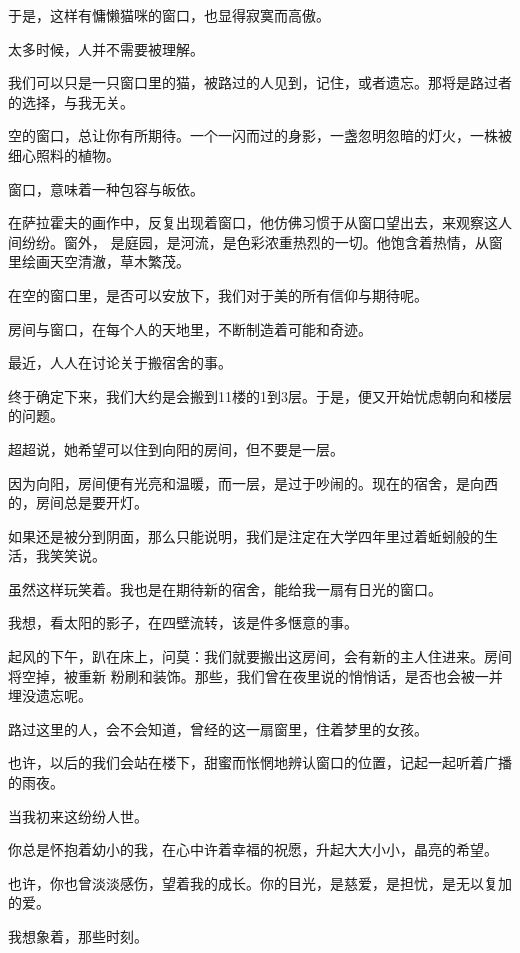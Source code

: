 		于是，这样有慵懒猫咪的窗口，也显得寂寞而高傲。


		太多时候，人并不需要被理解。

		我们可以只是一只窗口里的猫，被路过的人见到，记住，或者遗忘。那将是路过者的选择，与我无关。

		空的窗口，总让你有所期待。一个一闪而过的身影，一盏忽明忽暗的灯火，一株被细心照料的植物。

		窗口，意味着一种包容与皈依。

		在萨拉霍夫的画作中，反复出现着窗口，他仿佛习惯于从窗口望出去，来观察这人间纷纷。窗外，
	是庭园，是河流，是色彩浓重热烈的一切。他饱含着热情，从窗里绘画天空清澈，草木繁茂。

		在空的窗口里，是否可以安放下，我们对于美的所有信仰与期待呢。\par
		房间与窗口，在每个人的天地里，不断制造着可能和奇迹。

		最近，人人在讨论关于搬宿舍的事。\par
		终于确定下来，我们大约是会搬到11楼的1到3层。于是，便又开始忧虑朝向和楼层的问题。\par
		超超说，她希望可以住到向阳的房间，但不要是一层。\par
		因为向阳，房间便有光亮和温暖，而一层，是过于吵闹的。现在的宿舍，是向西的，房间总是要开灯。\par
		如果还是被分到阴面，那么只能说明，我们是注定在大学四年里过着蚯蚓般的生活，我笑笑说。

		虽然这样玩笑着。我也是在期待新的宿舍，能给我一扇有日光的窗口。\par
		我想，看太阳的影子，在四壁流转，该是件多惬意的事。

		起风的下午，趴在床上，问莫：我们就要搬出这房间，会有新的主人住进来。房间将空掉，被重新
	粉刷和装饰。那些，我们曾在夜里说的悄悄话，是否也会被一并埋没遗忘呢。

		路过这里的人，会不会知道，曾经的这一扇窗里，住着梦里的女孩。

		也许，以后的我们会站在楼下，甜蜜而怅惘地辨认窗口的位置，记起一起听着广播的雨夜。

	\endwriting



		当我初来这纷纷人世。\par
		你总是怀抱着幼小的我，在心中许着幸福的祝愿，升起大大小小，晶亮的希望。\par
		也许，你也曾淡淡感伤，望着我的成长。你的目光，是慈爱，是担忧，是无以复加的爱。

		我想象着，那些时刻。

